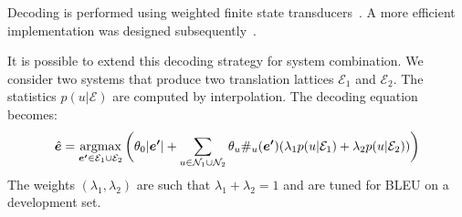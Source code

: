 Decoding is performed using weighted finite state
transducers~\citep{tromble-kumar-och-macherey:2008:EMNLP}. A more efficient
implementation was designed
subsequently~\citep{blackwood-degispert-byrne:2010:ACL,blackwood:2010:PHD}.

It is possible to extend this decoding strategy for system combination.
We consider two systems that produce two translation lattices
$\mathcal{E}_1$ and $\mathcal{E}_2$. The statistics
$p(u|\mathcal{E})$ are computed by interpolation. The decoding equation becomes:
%
\begin{equation}
  \hat{\bm{e}}=\operatorname*{argmax}_{\bm{e'} \in \mathcal{E}_1 \cup \mathcal{E}_2 } \bigg ( \theta_0|\bm{e'}|+\sum_{u \in \mathcal{N}_1 \cup \mathcal{N}_2}  \theta_u\#_u(\bm{e'}) (\lambda_{1} p(u|\mathcal{E}_1) + \lambda_2 p(u|\mathcal{E}_2)) \bigg )
\end{equation}
%
The weights $(\lambda_1,\lambda_2)$ are such that $\lambda_1+\lambda_2 = 1$ and are tuned for BLEU on a development set.
